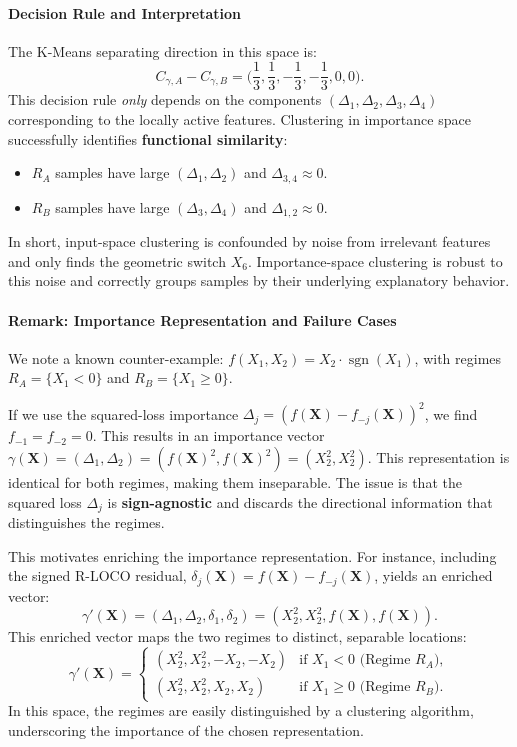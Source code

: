 \documentclass{article}
\theoremstyle{plain}
\theoremstyle{definition}
\theoremstyle{remark}
\begin{document}
\paragraph{Decision Rule and Interpretation}
The K-Means separating direction in this space is:
\[
C_{\gamma, A} - C_{\gamma, B} = \bigl(\frac{1}{3}, \frac{1}{3}, -\frac{1}{3}, -\frac{1}{3}, 0, 0\bigr).
\]
This decision rule \emph{only} depends on the components $(\Delta_1, \Delta_2, \Delta_3, \Delta_4)$ corresponding to the locally active features. Clustering in importance space successfully identifies \textbf{functional similarity}:
\begin{itemize}
    \item $R_A$ samples have large $(\Delta_1, \Delta_2)$ and $\Delta_{3,4} \approx 0$.
    \item $R_B$ samples have large $(\Delta_3, \Delta_4)$ and $\Delta_{1,2} \approx 0$.
\end{itemize}
In short, input-space clustering is confounded by noise from irrelevant features and only finds the geometric switch $X_6$. Importance-space clustering is robust to this noise and correctly groups samples by their underlying explanatory behavior.

\paragraph{Remark: Importance Representation and Failure Cases}
We note a known counter-example: $f(X_1, X_2) = X_2 \cdot \operatorname{sgn}(X_1)$, with regimes $R_A = \{X_1 < 0\}$ and $R_B = \{X_1 \ge 0\}$.

If we use the squared-loss importance $\Delta_j = (f(\mathbf{X}) - f_{-j}(\mathbf{X}))^2$, we find $f_{-1} = f_{-2} = 0$. This results in an importance vector $\gamma(\mathbf{X}) = (\Delta_1, \Delta_2) = (f(\mathbf{X})^2, f(\mathbf{X})^2) = (X_2^2, X_2^2)$. This representation is identical for both regimes, making them inseparable. The issue is that the squared loss $\Delta_j$ is \textbf{sign-agnostic} and discards the directional information that distinguishes the regimes.

This motivates enriching the importance representation. For instance, including the signed R-LOCO residual, $\delta_j(\mathbf{X}) = f(\mathbf{X}) - f_{-j}(\mathbf{X})$, yields an enriched vector:
\[
\gamma'(\mathbf{X}) = (\Delta_1, \Delta_2, \delta_1, \delta_2) = (X_2^2, X_2^2, f(\mathbf{X}), f(\mathbf{X})).
\]
This enriched vector maps the two regimes to distinct, separable locations:
\[
\gamma'(\mathbf{X}) = \begin{cases}
(X_2^2, X_2^2, -X_2, -X_2) & \text{if } X_1 < 0 \text{ (Regime } R_A\text{)}, \\
(X_2^2, X_2^2, X_2, X_2)  & \text{if } X_1 \ge 0 \text{ (Regime } R_B\text{)}.
\end{cases}
\]
In this space, the regimes are easily distinguished by a clustering algorithm, underscoring the importance of the chosen representation.
\end{document}
